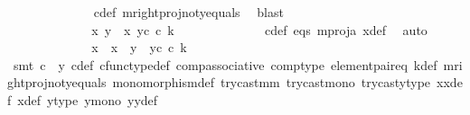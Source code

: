 \begin{isabellebody}
\ \ \ \ \ \ \ \ \ \ \ \ \isamarkupfalse%
\ c{\isacharunderscore}{\kern0pt}def\ m{\isacharunderscore}{\kern0pt}rightproj{\isacharunderscore}{\kern0pt}not{\isacharunderscore}{\kern0pt}y{}{\isacharunderscore}{\kern0pt}equals\ \isamarkupfalse%
\ blast\ \ \ \ \ \ \ \ \ \ \ \ \ \ \ \ \ \ \ \ \ \isanewline
\ \ \ \ \ \ \ \ \ \ \isamarkupfalse%
\ \isamarkupfalse%
\ {\isachardoublequoteopen}{\isasymlangle}x{\isacharcomma}{\kern0pt}\ y{}{\isasymrangle}\ {\isacharequal}{\kern0pt}\ {\isasymlangle}x{}{\isacharcomma}{\kern0pt}\ y{}\isactrlsup c\ {\isasymcirc}\isactrlsub c\ k{\isasymrangle}{\isachardoublequoteclose}\isanewline
\ \ \ \ \ \ \ \ \ \ \ \ \isamarkupfalse%
\ c{\isacharunderscore}{\kern0pt}def\ eqs\ m{\isacharunderscore}{\kern0pt}proj{\isacharunderscore}{\kern0pt}a\ x{\isacharunderscore}{\kern0pt}def\ \isamarkupfalse%
\ auto\isanewline
\ \ \ \ \ \ \ \ \ \ \isamarkupfalse%
\ \isamarkupfalse%
\ {\isachardoublequoteopen}{\isacharparenleft}{\kern0pt}x\ {\isacharequal}{\kern0pt}\ x{}{\isacharparenright}{\kern0pt}\ {\isasymand}\ {\isacharparenleft}{\kern0pt}y{}\ {\isacharequal}{\kern0pt}\ y{}\isactrlsup c\ {\isasymcirc}\isactrlsub c\ k{\isacharparenright}{\kern0pt}{\isachardoublequoteclose}\isanewline
\ \ \ \ \ \ \ \ \ \ \ \ \isamarkupfalse%
\ {\isacharparenleft}{\kern0pt}smt\ {\isacartoucheopen}c\ {\isasymnoteq}\ y{}{\isacartoucheclose}\ c{\isacharunderscore}{\kern0pt}def\ cfunc{\isacharunderscore}{\kern0pt}type{\isacharunderscore}{\kern0pt}def\ comp{\isacharunderscore}{\kern0pt}associative\ comp{\isacharunderscore}{\kern0pt}type\ element{\isacharunderscore}{\kern0pt}pair{\isacharunderscore}{\kern0pt}eq\ k{\isacharunderscore}{\kern0pt}def\ m{\isacharunderscore}{\kern0pt}rightproj{\isacharunderscore}{\kern0pt}not{\isacharunderscore}{\kern0pt}y{}{\isacharunderscore}{\kern0pt}equals\ monomorphism{\isacharunderscore}{\kern0pt}def{}\ try{\isacharunderscore}{\kern0pt}cast{\isacharunderscore}{\kern0pt}m{\isacharunderscore}{\kern0pt}m{\isacharprime}{\kern0pt}\ try{\isacharunderscore}{\kern0pt}cast{\isacharunderscore}{\kern0pt}mono\ trycast{\isacharunderscore}{\kern0pt}y{}{\isacharunderscore}{\kern0pt}type\ x{}x{}{\isacharunderscore}{\kern0pt}def{\isacharparenleft}{\kern0pt}{}{\isacharparenright}{\kern0pt}\ x{\isacharunderscore}{\kern0pt}def\ y{}{\isacharprime}{\kern0pt}{\isacharunderscore}{\kern0pt}type\ y{}{\isacharunderscore}{\kern0pt}mono\ y{}y{}{\isacharunderscore}{\kern0pt}def{\isacharparenleft}{\kern0pt}{}{\isacharparenright}{\kern0pt}{\isacharparenright}{\kern0pt}\isanewline

\end{isabellebody}
